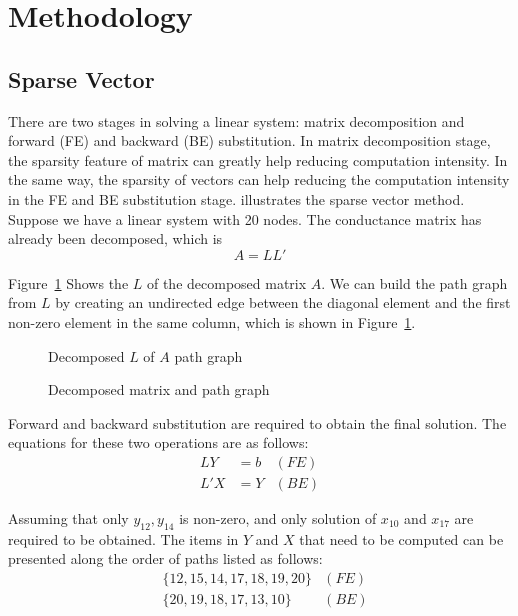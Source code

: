 \section{Methodology}
  \subsection{Sparse Vector}
    There are two stages in solving a linear system: matrix decomposition and forward (FE) and backward (BE) substitution. In matrix 
decomposition stage, the sparsity feature of matrix can greatly help reducing computation intensity. In the same way, the sparsity of 
vectors can help reducing the computation intensity in the FE and BE substitution stage. \cite{Tinney} illustrates the sparse vector 
method. Suppose we have a linear system with 20 nodes. The conductance matrix has already been decomposed, which is 
\begin{equation}
	A=LL'\label{eq3.1}
\end{equation}

Figure~\ref{eli_tree} Shows the $L$ of the decomposed matrix $A$. We can build the path graph from $L$ by creating an undirected edge between the diagonal element and the first non-zero element in the same column, which is shown in Figure~\ref{eli_tree}.

\begin{figure}[htbp]
 \centering
{}
 \caption{Decomposed matrix and path graph}
  Decomposed $L$ of $A$
  path graph
 \label{eli_tree}
\end{figure}

Forward and backward substitution are required to obtain the final solution. The equations for these two operations are as follows:
\begin{align}
	LY &=b  &(FE)\label{eq3.2}\\
	L'X &= Y&(BE)\label{eq3.3}
\end{align}

Assuming that only $y_{12}, y_{14}$ is non-zero, and only solution of $x_{10}$ and $x_{17}$ are required to be obtained. The items in $Y$ and $X$ that need to be computed can be presented along the order of paths listed as follows:
\begin{align}
&\{12, 15, 14, 17, 18, 19, 20\} &(FE)\label{eq3.4}\\
&\{20, 19, 18, 17, 13, 10\}&(BE)\label{eq3.5}
\end{align}

